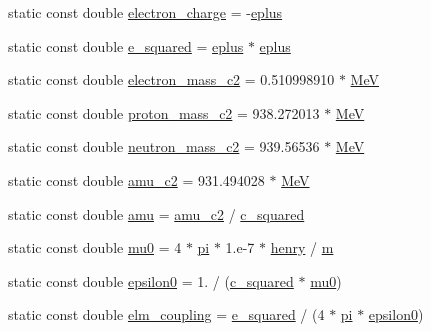 \begin{DoxyCompactItemize}
\item 
static const double \hyperlink{namespacedd4hep_ab3cc7a4c1edb82d85112753196db9368}{electron\_\-charge} = -\/\hyperlink{namespacedd4hep_a96ccff254b6dcebf179c3630f6205857}{eplus}
\item 
static const double \hyperlink{namespacedd4hep_a23b1828a7d7d90dc182eee3716cf27f6}{e\_\-squared} = \hyperlink{namespacedd4hep_a96ccff254b6dcebf179c3630f6205857}{eplus} $\ast$ \hyperlink{namespacedd4hep_a96ccff254b6dcebf179c3630f6205857}{eplus}
\item 
static const double \hyperlink{namespacedd4hep_a90fb8853ce4da9b13bd108593b2d154d}{electron\_\-mass\_\-c2} = 0.510998910 $\ast$ \hyperlink{namespacedd4hep_a6dee62809c6ee54d2fc90671f4dc8b91}{MeV}
\item 
static const double \hyperlink{namespacedd4hep_a368ce1f4ff6406804a6e11ba6c86ea3a}{proton\_\-mass\_\-c2} = 938.272013 $\ast$ \hyperlink{namespacedd4hep_a6dee62809c6ee54d2fc90671f4dc8b91}{MeV}
\item 
static const double \hyperlink{namespacedd4hep_a9e1f91639c11f55a3550815f9e0fca7d}{neutron\_\-mass\_\-c2} = 939.56536 $\ast$ \hyperlink{namespacedd4hep_a6dee62809c6ee54d2fc90671f4dc8b91}{MeV}
\item 
static const double \hyperlink{namespacedd4hep_a6bf5b89f5cde619efc44b8b11104932f}{amu\_\-c2} = 931.494028 $\ast$ \hyperlink{namespacedd4hep_a6dee62809c6ee54d2fc90671f4dc8b91}{MeV}
\item 
static const double \hyperlink{namespacedd4hep_a0b45315a57cae4bbe7083252cd13f6e8}{amu} = \hyperlink{namespacedd4hep_a6bf5b89f5cde619efc44b8b11104932f}{amu\_\-c2} / \hyperlink{namespacedd4hep_a1501a5f994e55104b62b1907ff652300}{c\_\-squared}
\item 
static const double \hyperlink{namespacedd4hep_aa3e5df0c9242afa74216e69bac6e639b}{mu0} = 4 $\ast$ \hyperlink{namespacedd4hep_ae71f82066d68af053eb8f60d0e13d3af}{pi} $\ast$ 1.e-\/7 $\ast$ \hyperlink{namespacedd4hep_adc130a4b9874431a4fb19fa27220372c}{henry} / \hyperlink{namespacedd4hep_a443d1517e365c8f0c3a498bff0f09088}{m}
\item 
static const double \hyperlink{namespacedd4hep_a7838df71bb4bd46b01798c559daadc4b}{epsilon0} = 1. / (\hyperlink{namespacedd4hep_a1501a5f994e55104b62b1907ff652300}{c\_\-squared} $\ast$ \hyperlink{namespacedd4hep_aa3e5df0c9242afa74216e69bac6e639b}{mu0})
\item 
static const double \hyperlink{namespacedd4hep_ace30ae02d909a752d5e3f2138bf4ecb1}{elm\_\-coupling} = \hyperlink{namespacedd4hep_a23b1828a7d7d90dc182eee3716cf27f6}{e\_\-squared} / (4 $\ast$ \hyperlink{namespacedd4hep_ae71f82066d68af053eb8f60d0e13d3af}{pi} $\ast$ \hyperlink{namespacedd4hep_a7838df71bb4bd46b01798c559daadc4b}{epsilon0})

\end{DoxyCompactItemize}
